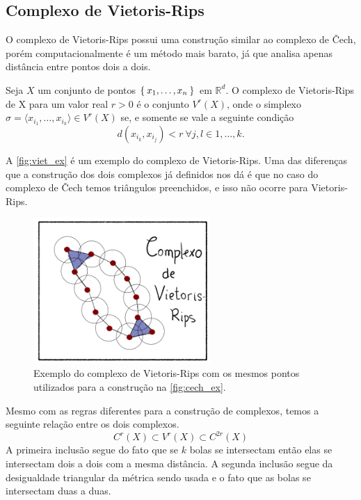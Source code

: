\subsection{Complexo de Vietoris-Rips}
O complexo de Vietoris-Rips possui uma construção similar ao complexo de \v{C}ech,
porém computacionalmente é um método mais barato, já que analisa apenas distância
entre pontos dois a dois.
\begin{defi}
  Seja $X$ um conjunto de pontos $\Set{x_1, \dots, x_n}$ em $\mathbb{R}^d$. O complexo
  de Vietoris-Rips de X para um valor real $r>0$ é o conjunto $V^r(X)$, onde o simplexo
  $\sigma = \langle x_{i_1}, \dots, x_{i_k} \rangle \in V^r(X)$ se, e somente se vale a seguinte
  condição
  \begin{equation*}
    d(x_{i_k}, x_{i_j}) < r \ \forall j,l \in{1,\dots,k}.
  \end{equation*}
\end{defi}
A \autoref{fig:viet_ex} é um exemplo do complexo de Vietoris-Rips. Uma das diferenças
que a construção dos dois complexos já definidos nos dá é que no caso do complexo
de \v{C}ech temos triângulos preenchidos, e isso não ocorre para Vietoris-Rips.
\begin{figure}[htb]
  \centering
  \includegraphics[width=0.6\textwidth]{images/ComplexRips.png}
  \caption{Exemplo do complexo de Vietoris-Rips com os mesmos pontos utilizados
  para a construção na \autoref{fig:cech_ex}.}
  \label{fig:viet_ex}
  \fautor
\end{figure}

Mesmo com as regras diferentes para a construção de complexos, temos a seguinte
relação entre os dois complexos.
\begin{equation}
  \label{eq:viet_cech}
  C^r(X) \subset V^r(X) \subset C^{2r}(X)
\end{equation}
A primeira inclusão segue do fato que se $k$ bolas se intersectam então elas se
intersectam dois a dois com a mesma distância. A segunda inclusão segue da
desigualdade triangular da métrica sendo usada e o fato que as bolas se
intersectam duas a duas.

